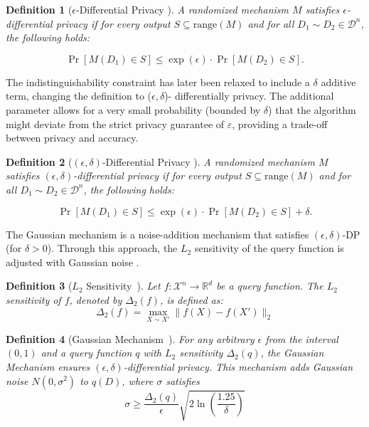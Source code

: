 \documentclass[11pt]{article}
\newtheorem{defn}{Definition}
\begin{document}
\begin{defn}[$\epsilon$-Differential Privacy \cite{DPSurvey,DPSurvey2}]
A randomized mechanism $M$ satisfies $\epsilon$-differential privacy if for every output $S \subseteq \text{range}(M)$ and for all $D_1 \sim D_2 \in \mathcal{D}^n$, the following holds:

\[
\Pr[M(D_1) \in S] \leq \exp(\epsilon) \cdot \Pr[M(D_2) \in S].
\]
\end{defn}


The indistinguishability constraint has later been relaxed to include a $\delta$ additive term, changing the definition to ($\epsilon, \delta$)- differentially privacy. The additional parameter allows for a very small probability (bounded by $\delta$) that the algorithm might deviate from the strict privacy guarantee of $\varepsilon$, providing a trade-off between privacy and accuracy. %
\begin{defn}[$(\epsilon, \delta)$-Differential Privacy \cite{concentrated,chen2020stochastic}]
A randomized mechanism $M$ satisfies $(\epsilon, \delta)$-differential privacy if for every output $S \subseteq \text{range}(M)$ and for all $D_1 \sim D_2 \in \mathcal{D}^n$, the following holds:

\[
\Pr[M(D_1) \in S] \leq \exp(\epsilon) \cdot \Pr[M(D_2) \in S] + \delta.
\]
\end{defn}

The Gaussian mechanism is a noise-addition mechanism that satisfies $(\epsilon,\delta)$-DP (for $\delta > 0$). Through this approach, the $L_2$ sensitivity of the query function is adjusted with Gaussian noise \cite{concentrated}.

\begin{defn}[$L_2$ Sensitivity~\cite{concentrated}]
Let $f: \mathcal{X}^n \rightarrow \mathbb{R}^d$ be a query function. The $L_2$ sensitivity of $f$, denoted by $\Delta_2(f)$, is defined as:
\[
\Delta_2(f) = \max_{X \sim X'} \| f(X) - f(X') \|_2
\]
\end{defn}

\begin{defn}[Gaussian Mechanism~\cite{concentrated}]
For any arbitrary $\epsilon$ from the interval $(0, 1)$ and a query function $q$ with $L_2$ sensitivity $\Delta_2(q)$, the Gaussian Mechanism ensures $(\epsilon, \delta)$-differential privacy. This mechanism adds Gaussian noise $N(0, \sigma^2)$ to $q(D)$, where $\sigma$ satisfies 
\[ \sigma \geq \frac{\Delta_2(q)}{\epsilon} \sqrt{2 \ln\left(\frac{1.25}{\delta}\right)} \]

\end{defn}
\end{document}
